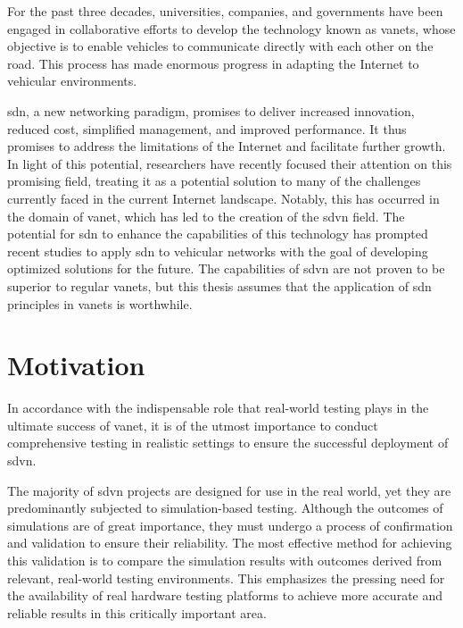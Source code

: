 For the past three decades, universities, companies, and governments have been engaged in collaborative efforts to develop the technology known as \glspl{vanet}, whose objective is to enable vehicles to communicate directly with each other on the road.
This process has made enormous progress in adapting the Internet to vehicular environments. %

\gls{sdn}, a new networking paradigm, promises to deliver increased innovation, reduced cost, simplified management, and improved performance.
It thus promises to address the limitations of the Internet and facilitate further growth. In light of this potential, researchers have recently focused their attention on this promising field, treating it as a potential solution to many of the challenges currently faced in the current Internet landscape.
Notably, this has occurred in the domain of \gls{vanet}, which has led to the creation of the \gls{sdvn} field. The potential for \gls{sdn} to enhance the capabilities of this technology has prompted recent studies to apply \gls{sdn} to vehicular networks with the goal of developing optimized solutions for the future. The capabilities of \gls{sdvn} are not proven to be superior to regular \glspl{vanet}, but this thesis assumes that the application of \gls{sdn} principles in \glspl{vanet} is worthwhile.


\section{Motivation} %
\label{sec:motivation}


In accordance with the indispensable role that real-world testing plays in the ultimate success of \gls{vanet}, it is of the utmost importance to conduct comprehensive testing in realistic settings to ensure the successful deployment of \gls{sdvn}. 

The majority of \gls{sdvn} projects are designed for use in the real world, yet they are predominantly subjected to simulation-based testing. Although the outcomes of simulations are of great importance, they must undergo a process of confirmation and validation to ensure their reliability. The most effective method for achieving this validation is to compare the simulation results with outcomes derived from relevant, real-world testing environments. This emphasizes the pressing need for the availability of real hardware testing platforms to achieve more accurate and reliable results in this critically important area. 

